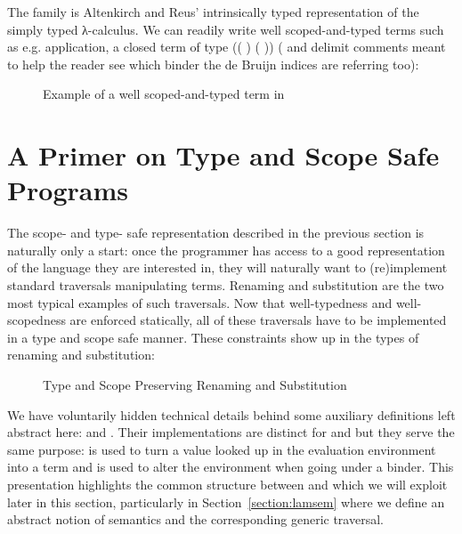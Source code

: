 The   family  is Altenkirch and Reus'
intrinsically typed representation of the simply typed λ-calculus.
We can readily write well scoped-and-typed terms such as e.g. application,
a closed term of type {((  )  (  ))}
(\AC{\{-} and \AC{-\}} delimit comments meant to help the reader see which
binder the de Bruijn indices are referring too):


\begin{figure}[h]
\label{figure:apply}
\caption{Example of a well scoped-and-typed term in }
\end{figure}




\section{A Primer on Type and Scope Safe Programs}\label{section:primer-program}

The scope- and type- safe representation described in the previous section is
naturally only a start: once the programmer has access to a good
representation of the language they are interested in, they will naturally
want to (re)implement standard traversals manipulating terms.
Renaming and substitution are the two most typical examples
of such traversals. Now that well-typedness and well-scopedness are enforced
statically, all of these traversals have to be implemented
in a type and scope safe manner.
These constraints show up in the types of renaming and substitution: %

\begin{figure}[h]
\begin{minipage}{0.50\textwidth}
\end{minipage}\hfill
\begin{minipage}{0.50\textwidth}
\end{minipage}
\caption{Type and Scope Preserving Renaming and Substitution}
\end{figure}

We have voluntarily hidden technical details behind some auxiliary definitions
left abstract here:  and . Their implementations are distinct
for  and  but they serve the same purpose:  is used to
turn a value looked up in the evaluation environment into a term and 
is used to alter the environment when going under a binder. This presentation
highlights the common structure between  and  which we will exploit
later in this section, particularly in Section~\ref{section:lamsem}
where we define an abstract notion of semantics and the corresponding generic traversal.

